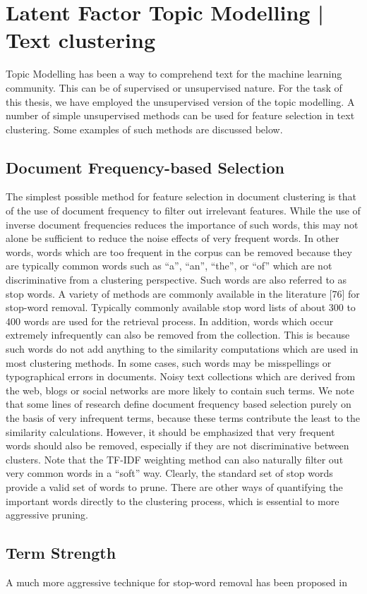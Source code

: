 \chapter{Latent Factor Topic Modelling | Text clustering}

Topic Modelling has been a way to comprehend text for the machine learning community. This can be of supervised or unsupervised nature. For the task of this thesis, we have employed the unsupervised version of the topic modelling. A number of simple unsupervised methods can be used for feature selection in text clustering. Some examples of such methods are discussed below.

\section{Document Frequency-based Selection}
The simplest possible method for feature selection in document clustering is that of the use of document frequency to filter out irrelevant features. While the use of inverse document frequencies reduces the importance of such words, this may not alone be sufficient to reduce the noise effects of very frequent words. In other words, words which are too frequent in the corpus can be removed because they are typically common words such as “a”, “an”, “the”, or “of” which are not discriminative from a clustering perspective. Such words are also referred to as stop words.
A variety of methods are commonly available in the literature [76] for stop-word removal.  Typically commonly available stop word lists of
about 300 to 400 words are used for the retrieval process. In addition,
words which occur extremely infrequently can also be removed from
the collection. This is because such words do not add anything to the
similarity computations which are used in most clustering methods. In some cases, such words may be misspellings or typographical errors in
documents. Noisy text collections which are derived from the web, blogs
or social networks are more likely to contain such terms. We note that
some lines of research define document frequency based selection purely
on the basis of very infrequent terms, because these terms contribute the
least to the similarity calculations. However, it should be emphasized
that very frequent words should also be removed, especially if they are
not discriminative between clusters. Note that the TF-IDF weighting
method can also naturally filter out very common words in a “soft” way.
Clearly, the standard set of stop words provide a valid set of words to
prune. There are other ways of quantifying the important words directly to the clustering process, which is essential to more aggressive pruning.

\section{Term Strength}
A much more aggressive technique for stop-word removal has been proposed in






